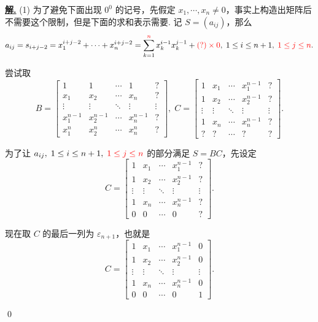 \documentclass[10pt,openany]{article}
\theoremstyle{thmstyle} %
\theoremstyle{defstyle} %
\theoremstyle{prostyle} %
\theoremstyle{exastyle}
\theoremstyle{remstyle}
\newenvironment{solution}{\par\underline{\textbf{解.}} \;\fangsong}{\qed\par}
\begin{document}
\begin{solution}
	(1) 为了避免下面出现 \( 0^0 \) 的记号，先假定 \( x_1,\cdots,x_n \neq 0 \)，事实上构造出矩阵后不需要这个限制，但是下面的求和表示需要. 记 \( S=(a_{ij}) \)，那么
	\[ a_{ij}=s_{i+j-2}=x_1^{i+j-2}+\cdots+x_n^{i+j-2}=\sum_{k=1}^{{\color{red} n}} x_k^{i-1} x_k^{j-1}+ {\color{red} (?) \times 0}, \; 1 \leq i \leq n+1, \; {\color{red}1 \leq j \leq n}. \]
	
	尝试取
	\[ B=\begin{bmatrix}
		1 & 1 & \cdots & 1 & ? \\
		x_1 & x_2 & \cdots & x_n & ? \\
		\vdots & \vdots & \ddots & \vdots & \vdots \\
		x_1^{n-1} & x_2^{n-1} & \cdots & x_n^{n-1} & ? \\
		x_1^n & x_2^{n} & \cdots & x_n^{n} & ? 
	\end{bmatrix}, \; C= \begin{bmatrix}
	1 & x_1 & \cdots & x_1^{n-1} & ? \\
	1 & x_2 & \cdots & x_2^{n-1} & ? \\
	\vdots & \vdots & \ddots & \vdots & \vdots \\
	1 & x_n & \cdots & x_n^{n-1} & ? \\
	? & ? & \cdots & ? & ?
	\end{bmatrix}. \]
	
	为了让 \( a_{ij}, \; 1 \leq i \leq n+1, \; {\color{red}1 \leq j \leq n} \) 的部分满足 \( S=BC \)，先设定
	\[ C= \begin{bmatrix}
		1 & x_1 & \cdots & x_1^{n-1} & ? \\
		1 & x_2 & \cdots & x_2^{n-1} & ? \\
		\vdots & \vdots & \ddots & \vdots & \vdots \\
		1 & x_n & \cdots & x_n^{n-1} & ? \\
		0 & 0 & \cdots & 0 & ?
	\end{bmatrix}. \]
	
	现在取 \( C \) 的最后一列为 \( \varepsilon_{n+1} \)，也就是
	\[ C= \begin{bmatrix}
		1 & x_1 & \cdots & x_1^{n-1} & 0 \\
		1 & x_2 & \cdots & x_2^{n-1} & 0 \\
		\vdots & \vdots & \ddots & \vdots & \vdots \\
		1 & x_n & \cdots & x_n^{n-1} & 0 \\
		0 & 0 & \cdots & 0 & 1
	\end{bmatrix}. \]
	

\end{solution}
\end{document}
